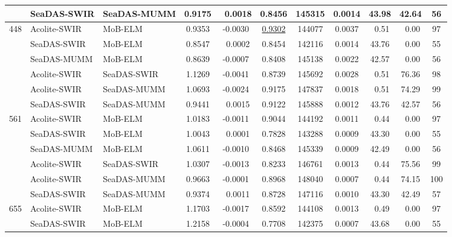 \begin{table}[!ht]
\begin{tabular}{cllcccccccc}
      &   SeaDAS-SWIR   &  SeaDAS-MUMM  & 0.9175  & ~0.0018 & 0.8456  & 145315  & 0.0014  &  43.98      & 42.64            &   56      \\  \hline
\multirow{6}{*}{448}&Acolite-SWIR&MoB-ELM     & 0.9353  & -0.0030 & \underline{0.9302}  & 144077  & 0.0037  &  ~0.51      & ~0.00            &   97      \\
      &   SeaDAS-SWIR   &  MoB-ELM      & 0.8547  & ~0.0002 & 0.8454  & 142116  & 0.0014  &  43.76      & ~0.00            &   55      \\
      &   SeaDAS-MUMM   &  MoB-ELM      & 0.8639  & -0.0007 & 0.8408  & 145138  & 0.0022  &  42.57      & ~0.00            &   56      \\ 
      &   Acolite-SWIR  &  SeaDAS-SWIR  & 1.1269  & -0.0041 & 0.8739  & 145692  & 0.0028  &  ~0.51      & 76.36            &   98      \\
      &   Acolite-SWIR  &  SeaDAS-MUMM  & 1.0693  & -0.0024 & 0.9175  & 147837  & 0.0018  &  ~0.51      & 74.29            &   99      \\
      &   SeaDAS-SWIR   &  SeaDAS-MUMM  & 0.9441  & ~0.0015 & 0.9122  & 145888  & 0.0012  &  43.76      & 42.57            &   56      \\ \hline
\multirow{6}{*}{561}&Acolite-SWIR&  MoB-ELM   & 1.0183  & -0.0011 & 0.9044  & 144192  & 0.0011  &  ~0.44      & ~0.00            &   97      \\
      &   SeaDAS-SWIR   &  MoB-ELM      & 1.0043  & ~0.0001 & 0.7828  & 143288  & 0.0009  &  43.30      & ~0.00            &   55      \\
      &   SeaDAS-MUMM   &  MoB-ELM      & 1.0611  & -0.0010 & 0.8468  & 145339  & 0.0009  &  42.49      & ~0.00            &   56      \\
      &   Acolite-SWIR  &  SeaDAS-SWIR  & 1.0307  & -0.0013 & 0.8233  & 146761  & 0.0013  &  ~0.44      & 75.56            &   99      \\
      &   Acolite-SWIR  &  SeaDAS-MUMM  & 0.9663  & -0.0001 & 0.8968  & 148040  & 0.0007  &  ~0.44      & 74.15            &   100     \\
        &   SeaDAS-SWIR   &  SeaDAS-MUMM  & 0.9374  & ~0.0011 & 0.8728  & 147116  & 0.0010  &  43.30      & 42.49            &   57      \\ \hline
\multirow{6}{*}{655}&Acolite-SWIR&MoB-ELM     & 1.1703  & -0.0017 & 0.8592  & 144108  & 0.0013  &  ~0.49      & ~0.00            &   97      \\
      &   SeaDAS-SWIR   &  MoB-ELM      & 1.2158  & -0.0004 & 0.7708  & 142375  & 0.0007  &  43.68      & ~0.00            &   55      \\

\end{tabular}
\end{table}
